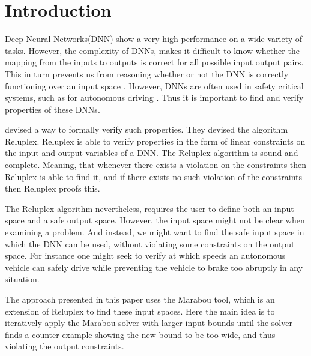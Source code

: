 \documentclass[../main.tex]{subfiles}
\begin{document}
\section{Introduction}\label{sec:introduction}
Deep Neural Networks(DNN) show a very high performance on a wide variety of tasks. However, the complexity of DNNs, makes it difficult to know whether the mapping from the inputs to outputs is correct for all possible input output pairs. This in turn prevents us from reasoning whether or not the DNN is correctly functioning over an input space \cite{szegedyIntriguingPropertiesNeural2014}. However, DNNs are often used in safety critical systems, such as for autonomous driving \cite{bojarskiEndEndLearning2016}. Thus it is important to find and verify properties of these DNNs.

\textcite{katzReluplexEfficientSMT2017} devised a way to formally verify such properties. They devised the algorithm Reluplex. Reluplex is able to verify properties in the form of linear constraints on the input and output variables of a DNN. The Reluplex algorithm is sound and complete. Meaning, that whenever there exists a violation on the constraints then Reluplex is able to find it, and if there exists no such violation of the constraints then Reluplex proofs this.

The Reluplex algorithm nevertheless, requires the user to define both an input space and a safe output space. However, the input space might not be clear when examining a problem. And instead, we might want to find the safe input space in which the DNN can be used, without violating some constraints on the output space. For instance one might seek to verify at which speeds an autonomous vehicle can safely drive while preventing the vehicle to brake too abruptly in any situation. 

The approach presented in this paper uses the Marabou\cite{katzMarabouFrameworkVerification2019} tool, which is an extension of Reluplex\cite{katzReluplexEfficientSMT2017} to find these input spaces. Here the main idea is to iteratively apply the Marabou solver with larger input bounds until the solver finds a counter example showing the new bound to be too wide, and thus violating the output constraints.
\end{document}
